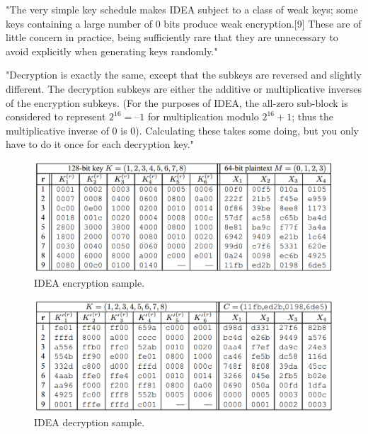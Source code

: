 \documentclass[a4paper,12pt,titlepage]{article}
\begin{document}
"The very simple key schedule makes IDEA subject to a class of weak keys; some keys containing a large number of 0 bits produce weak encryption.[9] These are of little concern in practice, being sufficiently rare that they are unnecessary to avoid explicitly when generating keys randomly." \citep{wiki:idea}

"Decryption is exactly the same, except that the subkeys are reversed and slightly different. The decryption subkeys are either the additive or multiplicative inverses of the encryption subkeys. (For the purposes of IDEA, the all-zero sub-block is considered to represent $2^16 = –1$ for multiplication 
modulo $2^{16} + 1$; thus the multiplicative inverse of 0 is 0). Calculating these takes some doing, but you only have to do it once for each decryption key." \citep{schneier_applied_1996}

\begin{figure}[!ht]
	\centering
	\label{fig:idea-enc}
	\includegraphics[width=\textwidth]{idea-enc.png}
	\caption{IDEA encryption sample. \citep{menezes_handbook_1996}}
\end{figure}

\begin{figure}[!ht]
	\centering
	\label{fig:idea-dec}
	\includegraphics[width=\textwidth]{idea-dec.png}
	\caption{IDEA decryption sample. \citep{menezes_handbook_1996}}
\end{figure}

\newpage


\end{document}

